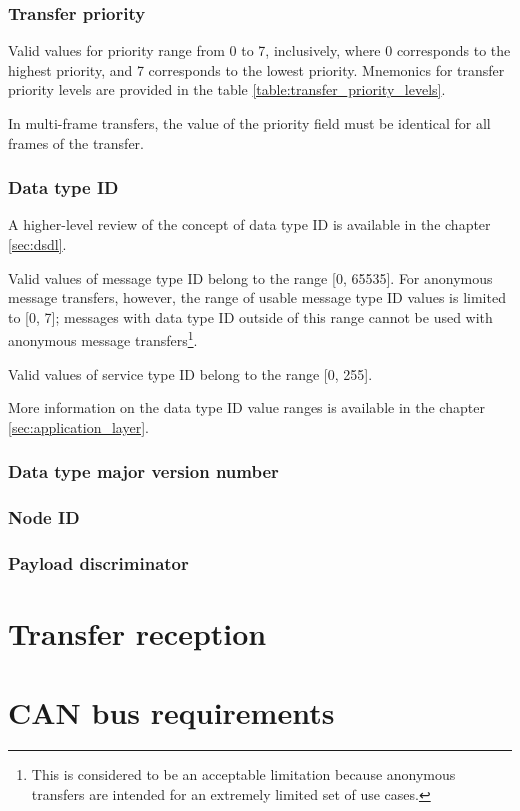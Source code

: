 \subsubsection{Transfer priority}

Valid values for priority range from 0 to 7, inclusively,
where 0 corresponds to the highest priority, and 7 corresponds to the lowest priority.
Mnemonics for transfer priority levels are provided in the table \ref{table:transfer_priority_levels}.

In multi-frame transfers, the value of the priority field must be identical for all frames of the transfer.

\subsubsection{Data type ID}

A higher-level review of the concept of data type ID is available in the chapter \ref{sec:dsdl}.

Valid values of message type ID belong to the range [0, 65535].
For anonymous message transfers, however, the range of usable message type ID values
is limited to [0, 7];
messages with data type ID outside of this range cannot be used with anonymous message
transfers\footnote{This is considered to be an acceptable limitation because anonymous transfers
are intended for an extremely limited set of use cases.}.

Valid values of service type ID belong to the range [0, 255].

More information on the data type ID value ranges is available in the chapter \ref{sec:application_layer}.

\subsubsection{Data type major version number}

\subsubsection{Node ID}

\subsubsection{Payload discriminator}

\section{Transfer reception}\label{sec:transfer_reception}

\section{CAN bus requirements}




